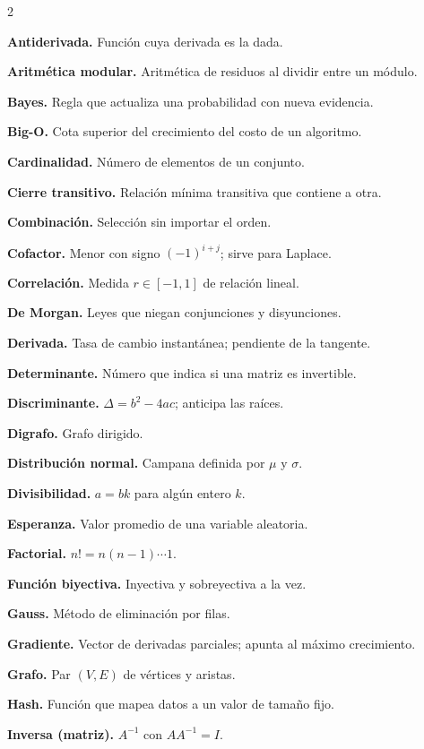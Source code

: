 \begin{multicols}{2}
\raggedright
\sffamily\small
\textbf{Antiderivada.} Funci\'on cuya derivada es la dada.

\textbf{Aritm\'etica modular.} Aritm\'etica de residuos al dividir entre un m\'odulo.

\textbf{Bayes.} Regla que actualiza una probabilidad con nueva evidencia.

\textbf{Big-O.} Cota superior del crecimiento del costo de un algoritmo.

\textbf{Cardinalidad.} N\'umero de elementos de un conjunto.

\textbf{Cierre transitivo.} Relaci\'on m\'inima transitiva que contiene a otra.

\textbf{Combinaci\'on.} Selecci\'on sin importar el orden.

\textbf{Cofactor.} Menor con signo $(-1)^{i+j}$; sirve para Laplace.

\textbf{Correlaci\'on.} Medida $r\in[-1, 1]$ de relaci\'on lineal.

\textbf{De Morgan.} Leyes que niegan conjunciones y disyunciones.

\textbf{Derivada.} Tasa de cambio instant\'anea; pendiente de la tangente.

\textbf{Determinante.} N\'umero que indica si una matriz es invertible.

\textbf{Discriminante.} $\Delta=b^2-4ac$; anticipa las ra\'ices.

\textbf{Digrafo.} Grafo dirigido.

\textbf{Distribuci\'on normal.} Campana definida por $\mu$ y $\sigma$.

\textbf{Divisibilidad.} $a=bk$ para alg\'un entero $k$.

\textbf{Esperanza.} Valor promedio de una variable aleatoria.

\textbf{Factorial.} $n!=n(n-1)\cdots1$.

\textbf{Funci\'on biyectiva.} Inyectiva y sobreyectiva a la vez.

\textbf{Gauss.} M\'etodo de eliminaci\'on por filas.

\textbf{Gradiente.} Vector de derivadas parciales; apunta al m\'aximo crecimiento.

\textbf{Grafo.} Par $(V, E)$ de v\'ertices y aristas.

\textbf{Hash.} Funci\'on que mapea datos a un valor de tama\~no fijo.

\textbf{Inversa (matriz).} $A^{-1}$ con $AA^{-1}=I$.


\end{multicols}
